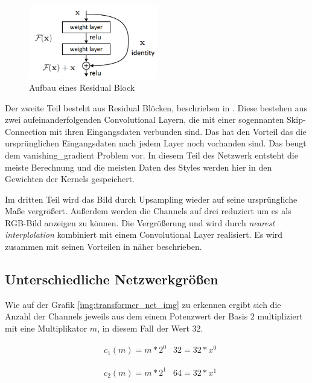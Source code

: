 \begin{figure}[H]
	\centering
	\includegraphics[width=0.50\textwidth]{resources/content/residual_block.png}
	\caption{Aufbau eines Residual Block \cite{residual_block_img}}
	\label{img:residual_block_img}
\end{figure}

Der zweite Teil besteht aus Residual Blöcken, beschrieben in \cite{DBLP:journals/corr/HeZRS15}. Diese bestehen aus zwei aufeinanderfolgenden Convolutional Layern, die mit einer sogennanten Skip-Connection mit ihren Eingangsdaten verbunden sind. Das hat den Vorteil das die ursprünglichen Eingangsdaten nach jedem Layer noch vorhanden sind. Das beugt dem \gls{vanishing_gradient} Problem vor. In diesem Teil des Netzwerk entsteht die meiste Berechnung und die meisten Daten des Styles werden hier in den Gewichten der Kernels gespeichert.

Im dritten Teil wird das Bild durch Upsampling wieder auf seine ursprüngliche Maße vergrößert. Außerdem werden die Channels auf drei reduziert um es als RGB-Bild anzeigen zu können. Die Vergrößerung und wird durch \textit{nearest interplolation} kombiniert mit einem Convolutional Layer realisiert.
Es wird zusammen mit seinen Vorteilen in \cite{odena2016deconvolution} näher beschrieben.

\pagebreak

\subsection{Unterschiedliche Netzwerkgrößen}

Wie auf der Grafik \ref{img:transformer_net_img} zu erkennen ergibt sich die Anzahl der Channels jeweils aus dem einem Potenzwert der Basis $ 2 $ multipliziert mit eine Multiplikator $ m $, in diesem Fall der Wert $ 32 $.

\begin{align}
	& c_{1}(m) = m * 2^{0}
	& 32 = 32 * x^{0}
\end{align}

\begin{align}
	& c_{2}(m) = m * 2^{1}
	& 64 = 32 * x^{1}
\end{align}

